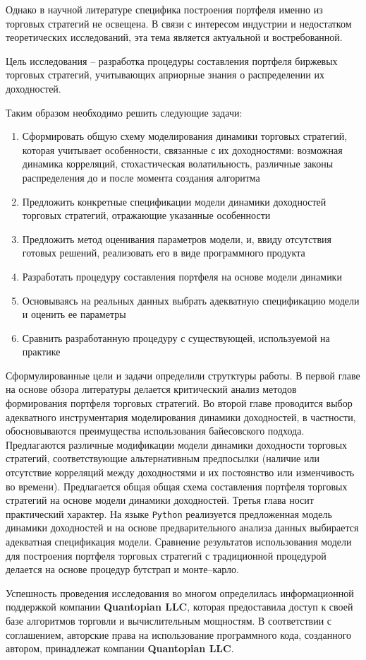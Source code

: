 Однако в научной литературе специфика построения портфеля именно из торговых стратегий не освещена. В связи с интересом индустрии и недостатком теоретических исследований, эта тема является актуальной и востребованной.

Цель исследования -- разработка процедуры составления портфеля биржевых торговых стратегий, учитывающих априорные знания о распределении их доходностей.

Таким образом необходимо решить следующие задачи:
\begin{enumerate}
	\item Сформировать общую схему моделирования динамики торговых стратегий, которая учитывает особенности, связанные с их доходностями: возможная динамика корреляций, стохастическая волатильность, различные законы распределения до и после момента создания алгоритма
	\item Предложить конкретные спецификации модели динамики доходностей торговых стратегий, отражающие указанные особенности
	\item Предложить метод оценивания параметров модели, и, ввиду отсутствия готовых решений, реализовать его в виде программного продукта
	\item Разработать процедуру составления портфеля на основе модели динамики
	\item Основываясь на реальных данных выбрать адекватную спецификацию модели и оценить ее параметры
	\item Сравнить разработанную процедуру с существующей, используемой на практике
\end{enumerate}

Сформулированные цели и задачи определили струтктуры работы. В первой главе на основе обзора литературы делается критический анализ методов формирования портфеля торговых стратегий.
Во второй главе проводится выбор адекватного инструментария моделирования динамики доходностей, в частности, обосновываются преимущества использования байесовского подхода. Предлагаются различные модификации модели динамики доходности торговых стратегий, соответствующие альтернативным предпосылки (наличие или отсутствие корреляций между доходностями и их постоянство или изменчивость во времени). Предлагается общая общая схема составления портфеля торговых стратегий на основе модели динамики доходностей.
Третья глава носит практический характер. На языке \texttt{Python} реализуется предложенная модель динамики доходностей и на основе предварительного анализа данных выбирается адекватная спецификация модели. Сравнение результатов использования модели  для построения портфеля торговых стратегий с традиционной процедурой делается на основе процедур бутстрап и монте--карло.

Успешность проведения исследования во многом определилась информационной поддержкой компании \textbf{Quantopian LLC}, которая предоставила доступ к своей базе алгоритмов торговли и вычислительным мощностям. В соответствии с соглашением, авторские права на использование программного кода, созданного автором, принадлежат компании \textbf{Quantopian LLC}.
